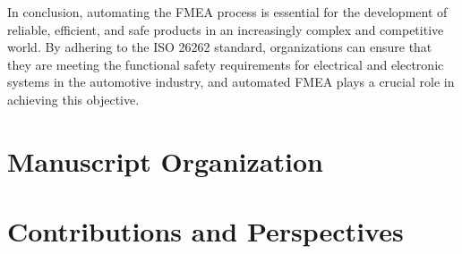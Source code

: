 \documentclass[./dissertation.tex]{subfiles}
\begin{document}
In conclusion, automating the FMEA process is essential for the development of reliable, efficient, and safe products in an increasingly complex and competitive world. By adhering to the ISO 26262 standard, organizations can ensure that they are meeting the functional safety requirements for electrical and electronic systems in the automotive industry, and automated FMEA plays a crucial role in achieving this objective.


\section{Manuscript Organization}



\section{Contributions and Perspectives}
\end{document}
